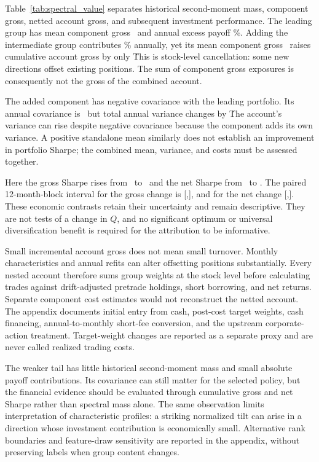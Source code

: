 

Table~\ref{tab:spectral_value} separates historical second-moment mass,
component gross, netted account gross, and subsequent investment performance.
The leading group has mean component gross \LeadingGross\ and annual excess
payoff \LeadingMean\%. Adding the intermediate group contributes
\IntermediateMean\% annually, yet its mean component gross \IntermediateGross\
raises cumulative account gross by only \IncrementalGross\. This is stock-level
cancellation: some new directions offset existing positions. The sum of
component gross exposures is consequently not the gross of the combined
account.

The added component has negative covariance with the leading portfolio.
Its annual covariance is \IntermediateCovariance\, but total annual variance
changes by \IntermediateVariance\. The account's variance can rise despite
negative covariance because the component adds its own variance. A positive
standalone mean similarly does not establish an improvement in portfolio
Sharpe; the combined mean, variance, and costs must be assessed together.

Here the gross Sharpe rises from \LeadingSR\ to \TwoGroupSR\, and the net
Sharpe from \LeadingNetSR\ to \TwoGroupNetSR. The paired 12-month-block
interval for the gross change is [\GroupGrossLow,\GroupGrossHigh], and for
the net change [\GroupNetLow,\GroupNetHigh]. These economic contrasts retain
their uncertainty and remain descriptive. They are not tests of a change in
$Q$, and no significant optimum or universal diversification benefit is
required for the attribution to be informative.

Small incremental account gross does not mean small turnover. Monthly
characteristics and annual refits can alter offsetting positions substantially.
Every nested account therefore sums group weights at the stock level before
calculating trades against drift-adjusted pretrade holdings, short borrowing,
and net returns. Separate component cost estimates would not reconstruct the
netted account. The appendix documents initial entry from cash, post-cost
target weights, cash financing, annual-to-monthly short-fee conversion, and
the upstream corporate-action treatment. Target-weight changes are reported
as a separate proxy and are never called realized trading costs.

The weaker tail has little historical second-moment mass and small absolute
payoff contributions. Its covariance can still matter for the selected
policy, but the financial evidence should be evaluated through cumulative
gross and net Sharpe rather than spectral mass alone. The same observation
limits interpretation of characteristic profiles: a striking normalized tilt
can arise in a direction whose investment contribution is economically small.
Alternative rank boundaries and feature-draw sensitivity are reported in the
appendix, without preserving labels when group content changes.

